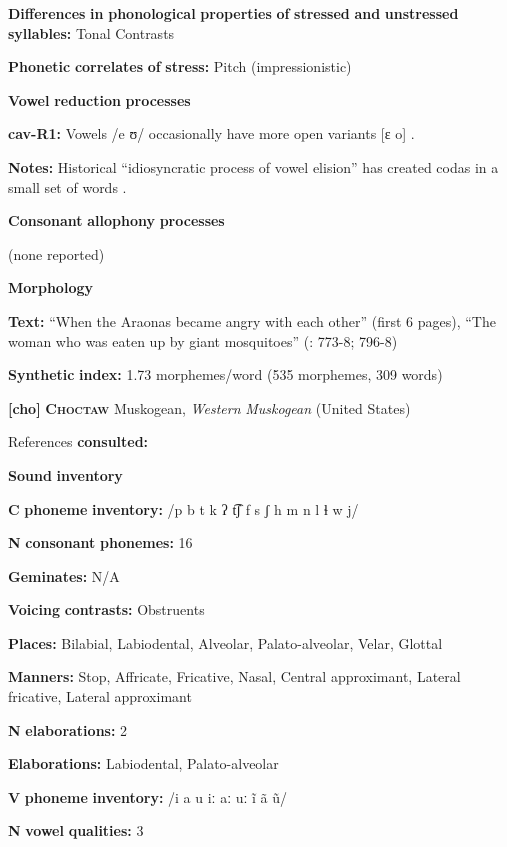 \textbf{Differences} \textbf{in} \textbf{phonological} \textbf{properties} \textbf{of} \textbf{stressed} \textbf{and} \textbf{unstressed} \textbf{syllables:} Tonal Contrasts

\textbf{Phonetic} \textbf{correlates} \textbf{of} \textbf{stress:} Pitch (impressionistic)

\textbf{Vowel} \textbf{reduction} \textbf{processes}

\textbf{cav-R1:} Vowels /e ʊ/ occasionally have more open variants [ɛ o] \citep[29]{Guillaume2008}.

\textbf{Notes:} Historical “idiosyncratic process of vowel elision” has created codas in a small set of words \citep[29]{Guillaume2008}.

\textbf{Consonant} \textbf{allophony} \textbf{processes}

(none reported)

\textbf{Morphology}

\textbf{Text:} “When the Araonas became angry with each other” (first 6 pages), “The woman who was eaten up by giant mosquitoes” (\citealt{Guillaume2008}: 773-8; 796-8)

\textbf{Synthetic} \textbf{index:} 1.73 morphemes/word (535 morphemes, 309 words)

\textbf{[cho]}   \textbf{\textsc{Choctaw}}  Muskogean, \textit{Western} \textit{Muskogean} (United States)

References \textbf{consulted:} \citet{Broadwell2006}

\textbf{Sound} \textbf{inventory}

\textbf{C} \textbf{phoneme} \textbf{inventory:} /p b t k ʔ t͡ʃ f s ʃ h m n l ɬ w j/

\textbf{N} \textbf{consonant} \textbf{phonemes:} 16

\textbf{Geminates:} N/A

\textbf{Voicing} \textbf{contrasts:} Obstruents

\textbf{Places:} Bilabial, Labiodental, Alveolar, Palato-alveolar, Velar, Glottal

\textbf{Manners:} Stop, Affricate, Fricative, Nasal, Central approximant, Lateral fricative, Lateral approximant

\textbf{N} \textbf{elaborations:} 2

\textbf{Elaborations:} Labiodental, Palato-alveolar

\textbf{V} \textbf{phoneme} \textbf{inventory:} /i a u iː aː uː ĩ ã ũ/

\textbf{N} \textbf{vowel} \textbf{qualities:} 3

